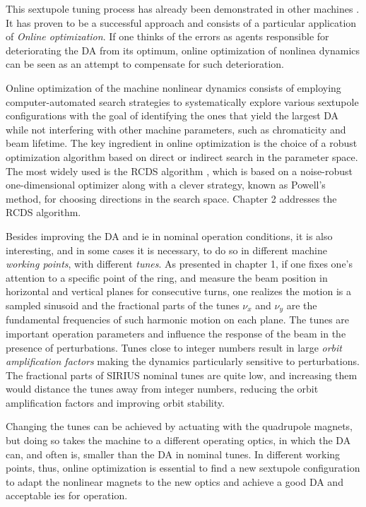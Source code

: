 This sextupole tuning process has already been demonstrated in other machines \cite{huang_algorithm_2013, huang_online_2015,liuzzo_rcds_2016,olsson_online_2018, yang_online_2022}. It has proven to be a successful approach and consists of a particular application of \textit{Online optimization}. If one thinks of the errors as agents responsible for deteriorating the \gls*{DA} from its optimum, online optimization of nonlinea dynamics can be seen as an attempt to compensate for such deterioration.

Online optimization of the machine nonlinear dynamics consists of employing computer-automated search strategies to systematically explore various sextupole configurations with the goal of identifying the ones that yield the largest DA while not interfering with other machine parameters, such as chromaticity and beam lifetime. The key ingredient in online optimization is the choice of a robust optimization algorithm based on direct or indirect search in the parameter space. The most widely used is the \gls*{RCDS} algorithm \cite{huang_algorithm_2013}, which is based on a noise-robust one-dimensional optimizer along with a clever strategy, known as Powell's method, for choosing directions in the search space. Chapter 2 addresses the RCDS algorithm.

Besides improving the \gls*{DA} and \gls*{ie} in nominal operation conditions, it is also interesting, and in some cases it is necessary, to do so in different machine \textit{working points}, with different \textit{tunes}. As presented in chapter 1, if one fixes one's attention to a specific point of the ring, and measure the beam position in horizontal and vertical planes for consecutive turns, one realizes the motion is a sampled sinusoid and the fractional parts of the tunes $\nu_x$ and $\nu_y$ are the fundamental frequencies of such harmonic motion on each plane. The tunes are important operation parameters and influence the response of the beam in the presence of perturbations. Tunes close to integer numbers result in large \textit{orbit amplification factors} making the dynamics particularly sensitive to perturbations. The fractional parts of SIRIUS nominal tunes are quite low, and increasing them would distance the tunes away from integer numbers, reducing the orbit amplification factors and improving orbit stability.

Changing the tunes can be achieved by actuating with the quadrupole magnets, but doing so takes the machine to a different operating optics, in which the DA can, and often is, smaller than the \gls*{DA} in nominal tunes. In different working points, thus, online optimization is essential to find a new sextupole configuration to adapt the nonlinear magnets to the new optics and achieve a good DA and acceptable \glspl*{ie} for operation.

